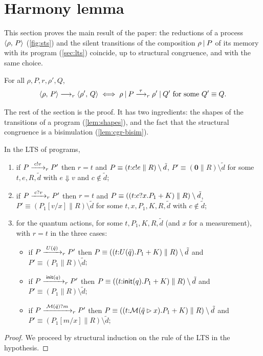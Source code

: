 \section{Harmony lemma}\label{sec:harmony}

This section proves the main result of the paper: the reductions of a
process $\langle \rho ,\, P \rangle$ (\cref{fig:sts}) and the silent transitions of the
composition $\rho \mathbin{|} P$ of its memory with its program (\cref{sec:lts})
coincide, up to structural congruence, and with the same choice.

\begin{theorem}[Harmony]\label{lem:harmony}
For all $\rho, P, r, \rho', Q$,
\[
\langle \rho ,\, P \rangle \longrightarrow_{r} \langle \rho' ,\, Q \rangle
\iff
\rho \mathbin{|} P \xrightarrow{\;\tau\;}_{r} \rho' \mathbin{|} Q' \text{ for some } Q' \equiv Q.
\]
\end{theorem}

The rest of the section is the proof. It has two ingredients: the shapes of the transitions of a program
(\cref{lem:shapes}), and the fact that the structural congruence is a
bisimulation (\cref{lem:cgr-bisim}).

\begin{lemma}\label{lem:shapes}
In the LTS of programs,
\begin{enumerate}
\item if $P \xrightarrow{\;c!v\;}_{r} P'$ then $r = t$ and
  $P \equiv (t{:}c!e \parallel R) \setminus \tilde d$,
  $P' \equiv (\mathbf{0} \parallel R) \setminus \tilde d$ for some $t, e, R, \tilde d$
  with $e \Downarrow v$ and $c \notin \tilde d$;
\item if $P \xrightarrow{\;c?v\;}_{r} P'$ then $r = t$ and
  $P \equiv ((t{:}c?x.P_1 + K) \parallel R) \setminus \tilde d$,
  $P' \equiv (P_1[v/x] \parallel R) \setminus \tilde d$ for some
  $t, x, P_1, K, R, \tilde d$ with $c \notin \tilde d$;
\item for the quantum actions, for some $t, P_1, K, R, \tilde d$ (and $x$
  for a measurement), with $r = t$ in the three cases:
  \begin{itemize}
  \item if $P \xrightarrow{\;U(\tilde q)\;}_{r} P'$ then
    $P \equiv ((t{:}U(\tilde q).P_1 + K) \parallel R) \setminus \tilde d$ and
    $P' \equiv (P_1 \parallel R) \setminus \tilde d$;
  \item if $P \xrightarrow{\;\mathsf{init}(q)\;}_{r} P'$ then
    $P \equiv ((t{:}\mathsf{init}(q).P_1 + K) \parallel R) \setminus \tilde d$ and
    $P' \equiv (P_1 \parallel R) \setminus \tilde d$;
  \item if $P \xrightarrow{\;\mathcal{M}(\tilde q)?m\;}_{r} P'$ then
    $P \equiv ((t{:}\mathcal{M}(\tilde q \rhd x).P_1 + K) \parallel R) \setminus \tilde d$ and
    $P' \equiv (P_1[m/x] \parallel R) \setminus \tilde d$;
  \end{itemize}
\end{enumerate}
\end{lemma}
\begin{proof}
  We proceed by structural induction on the rule of the LTS in the hypothesis.
\end{proof}

